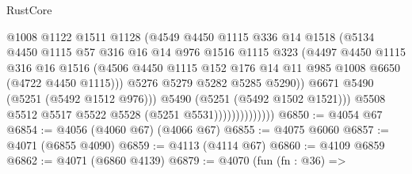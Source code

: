 \begin{lexlean}{RustCore}
\begin{coremodule}
                                  @1008
                                  @1122
                                  @1511
                                  @1128
                                  (@4549
                                    @4450
                                    @1115
                                    @336
                                    @14
                                    @1518
                                    (@5134
                                      @4450
                                      @1115
                                      @57
                                      @316
                                      @16
                                      @14
                                      @976
                                      @1516
                                      @1115
                                      @323
                                      (@4497
                                        @4450
                                        @1115
                                        @316
                                        @16
                                        @1516
                                        (@4506
                                          @4450
                                          @1115
                                          @152
                                          @176
                                          @14
                                          @11
                                          @985
                                          @1008
                                          @6650
                                          (@4722 @4450 @1115)))
                                      @5276
                                      @5279
                                      @5282
                                      @5285
                                      @5290))
                                  @6671
                                  @5490
                                  (@5251 (@5492 @1512 @976)))
                                @5490
                                (@5251 (@5492 @1502 @1521)))
                              @5508
                              @5512
                              @5517
                              @5522
                              @5528
                              (@5251 @5531))))))))))))))
@6850 := @4054 @67
@6854 := @4056 (@4060 @67) (@4066 @67)
@6855 := @4075 @6060
@6857 := @4071 (@6855 @4090)
@6859 := @4113 (@4114 @67)
@6860 := @4109 @6859
@6862 := @4071 (@6860 @4139)
@6879 := @4070
    (fun (fn : @36) =>

\end{coremodule}
\end{lexlean}
